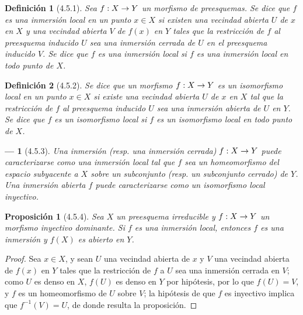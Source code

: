 \documentclass[oneside]{amsart}
\theoremstyle{ega-env-style}
\newtheorem*{env}{---}
\theoremstyle{ega-thm-env-style}
\newtheorem*{proposition}{Proposición}
\theoremstyle{ega-defn-env-style}
\newtheorem*{definition}{Definición}
\renewcommand{\to}{\mathchoice{\longrightarrow}{\rightarrow}{\rightarrow}{\rightarrow}}
\newcommand{\oldpage}[2][]{{\marginnote{\normalfont{\textbf{#1}~|~#2}}}\ignorespaces}
\let\EGAOriginalLabel\label
\renewcommand{\label}[1]{\phantomsection\EGAOriginalLabel{#1}}
\begin{document}
\begin{definition}[4.5.1]
\label{I.4.5.1}
{\itshape Sea $f:X\to Y$ un morfismo de preesquemas.
Se dice que $f$ es una inmersión local en un punto $x\in X$ si existen una vecindad abierta $U$ de $x$ en $X$ y una vecindad abierta $V$ de $f(x)$ en $Y$ tales que la restricción de $f$ al preesquema inducido $U$ sea una inmersión cerrada de $U$ en el preesquema inducido $V$.
Se dice que $f$ es una inmersión local si $f$ es una inmersión local en todo punto de $X$.}
\end{definition}

\begin{definition}[4.5.2]
\label{I.4.5.2}
Se dice que un morfismo $f:X\to Y$ es un isomorfismo local en
\oldpage[I]{127}
un punto $x\in X$ si existe una vecindad abierta $U$ de $x$ en $X$ tal que la restricción de $f$ al preesquema inducido $U$ sea una inmersión abierta de $U$ en $Y$.
Se dice que $f$ es un isomorfismo local si $f$ es un isomorfismo local en todo punto de $X$.
\end{definition}

\begin{env}[4.5.3]
\label{I.4.5.3}
Una inmersión (resp. una inmersión cerrada) $f:X\to Y$ puede caracterizarse como una inmersión local tal que $f$ sea un homeomorfismo del espacio subyacente a $X$ sobre un subconjunto (resp. un subconjunto cerrado) de $Y$.
Una inmersión abierta $f$ puede caracterizarse como un isomorfismo local \emph{inyectivo}.
\end{env}

\begin{proposition}[4.5.4]
\label{I.4.5.4}
Sea $X$ un preesquema irreducible y $f:X\to Y$ un morfismo inyectivo dominante.
Si $f$ es una inmersión local, entonces $f$ es una inmersión y $f(X)$ es abierto en $Y$.
\end{proposition}

\begin{proof}
Sea $x\in X$, y sean $U$ una vecindad abierta de $x$ y $V$ una vecindad abierta de $f(x)$ en $Y$ tales que la restricción de $f$ a $U$ sea una inmersión cerrada en $V$;
como $U$ es denso en $X$, $f(U)$ es denso en $Y$ por hipótesis, por lo que $f(U)=V$, y $f$ es un homeomorfismo de $U$ sobre $V$;
la hipótesis de que $f$ es inyectivo implica que $f^{-1}(V)=U$, de donde resulta la proposición.
\end{proof}
\end{document}
